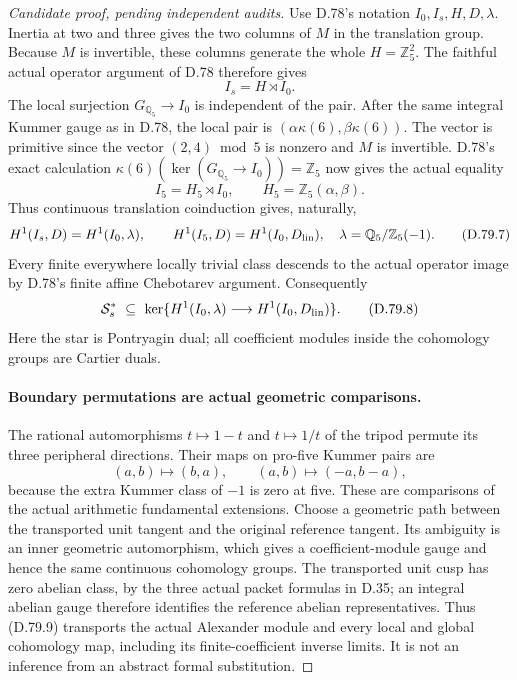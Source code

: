 \begin{proof}[Candidate proof, pending independent audits]
Use D.78's notation \(I_0,I_s,H,D,\lambda\). Inertia at two and
three gives the two columns of \(M\) in the translation group.
Because \(M\) is invertible, these columns generate the whole
\(H=\mathbb Z_5^2\). The faithful actual operator argument of
D.78 therefore gives
\[
 I_s=H\rtimes I_0.
                                                               \tag{D.79.5}
\]
The local surjection \(G_{\mathbb Q_5}\to I_0\) is independent
of the pair. After the same integral Kummer gauge as in D.78,
the local pair is \((\alpha\kappa(6),\beta\kappa(6))\).
The vector is primitive since the vector \((2,4)\bmod5\) is
nonzero and \(M\) is invertible. D.78's exact calculation
\(\kappa(6)(\ker(G_{\mathbb Q_5}\to I_0))=\mathbb Z_5\)
now gives the actual equality
\[
 I_5=H_5\rtimes I_0,
 \qquad H_5=\mathbb Z_5(\alpha,\beta).
                                                               \tag{D.79.6}
\]
Thus continuous translation coinduction gives, naturally,
\[
 H^1(I_s,D)=H^1(I_0,\lambda),\qquad
 H^1(I_5,D)=H^1(I_0,D_{\rm lin}),
 \quad\lambda=\mathbb Q_5/\mathbb Z_5(-1).
                                                               \tag{D.79.7}
\]
Every finite everywhere locally trivial class descends to the actual
operator image by D.78's finite affine Chebotarev argument.
Consequently
\[
 \mathcal S_s^*\ \subseteq\
 \ker\{H^1(I_0,\lambda)\longrightarrow H^1(I_0,D_{\rm lin})\}.
                                                               \tag{D.79.8}
\]
Here the star is Pontryagin dual; all coefficient modules inside
the cohomology groups are Cartier duals.

\paragraph{Boundary permutations are actual geometric comparisons.}
The rational automorphisms \(t\mapsto1-t\) and \(t\mapsto1/t\)
of the tripod permute its three peripheral directions. Their
maps on pro-five Kummer pairs are
\[
 (a,b)\longmapsto(b,a),\qquad
 (a,b)\longmapsto(-a,b-a),                              \tag{D.79.9}
\]
because the extra Kummer class of \(-1\) is zero at five.
These are comparisons of the actual arithmetic fundamental
extensions. Choose a geometric path between the transported unit
tangent and the original reference tangent. Its ambiguity is an
inner geometric automorphism, which gives a coefficient-module
gauge and hence the same continuous cohomology groups. The
transported unit cusp has zero abelian class, by the three actual
packet formulas in D.35; an integral abelian gauge therefore
identifies the reference abelian representatives. Thus (D.79.9)
transports the actual Alexander module and every local and global
cohomology map, including its finite-coefficient inverse limits.
It is not an inference from an abstract formal substitution.


\end{proof}
